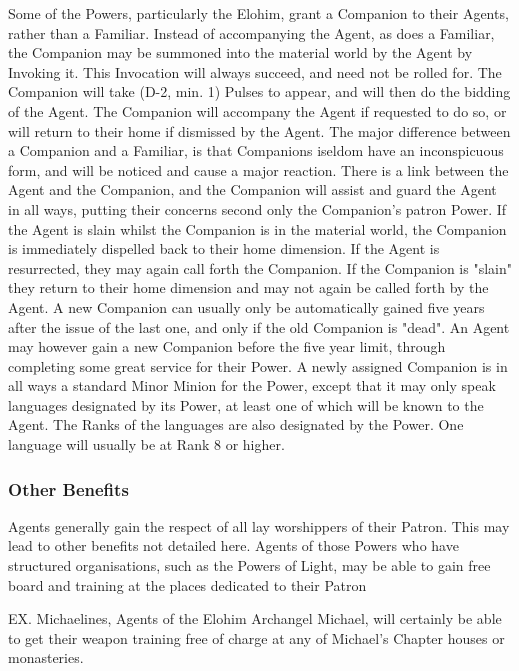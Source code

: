Some of the Powers, particularly the Elohim, grant a Companion to
their Agents, rather than a Familiar. Instead of accompanying the
Agent, as does a Familiar, the Companion may be summoned into the
material world by the Agent by Invoking it.  This Invocation will
always succeed, and need not be rolled for.  The Companion will take
(D-2, min. 1) Pulses to appear, and will then do the bidding of the
Agent.  The Companion will accompany the Agent if requested to do so,
or will return to their home if dismissed by the Agent.  The major
difference between a Companion and a Familiar, is that Companions
iseldom have an inconspicuous form, and will be noticed and cause a
major reaction.  There is a link between the Agent and the Companion,
and the Companion will assist and guard the Agent in all ways, putting
their concerns second only the Companion's patron Power.  If the Agent
is slain whilst the Companion is in the material world, the Companion
is immediately dispelled back to their home dimension.  If the Agent
is resurrected, they may again call forth the Companion.  If the
Companion is "slain" they return to their home dimension and may not
again be called forth by the Agent.  A new Companion can usually only
be automatically gained five years after the issue of the last one,
and only if the old Companion is "dead".  An Agent may however gain a
new Companion before the five year limit, through completing some
great service for their Power.  A newly assigned Companion is in all
ways a standard Minor Minion for the Power, except that it may only
speak languages designated by its Power, at least one of which will be
known to the Agent.  The Ranks of the languages are also designated by
the Power.  One language will usually be at Rank 8 or higher.

\subsubsection{Other Benefits}

Agents generally gain the respect of all lay worshippers of their
Patron.  This may lead to other benefits not detailed here.  Agents of
those Powers who have structured organisations, such as the Powers of
Light, may be able to gain free board and training at the places
dedicated to their Patron

EX. Michaelines, Agents of the Elohim Archangel Michael, will
certainly be able to get their weapon training free of charge at any
of Michael's Chapter houses or monasteries.

